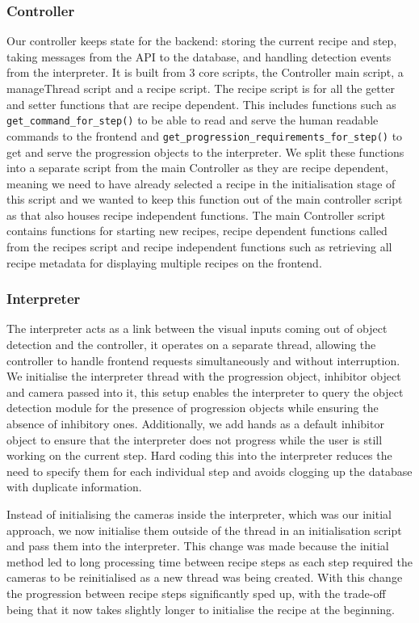 \documentclass{article}
\begin{document}
    \subsubsection{Controller}
    Our controller keeps state for the backend: storing the current recipe and step, taking messages from the API to the database, and handling detection events from the interpreter. It is built from 3 core scripts, the Controller main script, a manageThread script and a recipe script. 
    The recipe script is for all the getter and setter functions that are recipe dependent. This includes functions such as \verb|get_command_for_step()| to be able to read and serve the human readable commands to the frontend and \verb|get_progression_requirements_for_step()| to get and serve the progression objects to the interpreter. We split these functions into a separate script from the main Controller as they are recipe dependent, meaning we need to have already selected a recipe in the initialisation stage of this script and we wanted to keep this function out of the main controller script as that also houses recipe independent functions.
    The main Controller script contains functions for starting new recipes, recipe dependent functions called from the recipes script and recipe independent functions such as retrieving all recipe metadata for displaying multiple recipes on the frontend.
    \subsubsection{Interpreter}
    The interpreter acts as a link between the visual inputs coming out of object detection and the controller, it operates on a separate thread, allowing the controller to handle frontend requests simultaneously and without interruption. We initialise the interpreter thread with the progression object, inhibitor object and camera passed into it, this setup enables the interpreter to query the object detection module for the presence of progression objects while ensuring the absence of inhibitory ones. Additionally, we add hands as a default inhibitor object to ensure that the interpreter does not progress while the user is still working on the current step. Hard coding this into the interpreter reduces the need to specify them for each individual step and avoids clogging up the database with duplicate information.
    
    Instead of initialising the cameras inside the interpreter, which was our initial approach, we now initialise them outside of the thread in an initialisation script and pass them into the interpreter. This change was made because the initial method led to long processing time between recipe steps as each step required the cameras to be reinitialised as a new thread was being created. With this change the progression between recipe steps significantly sped up, with the trade-off being that it now takes slightly longer to initialise the recipe at the beginning.
    
\end{document}
